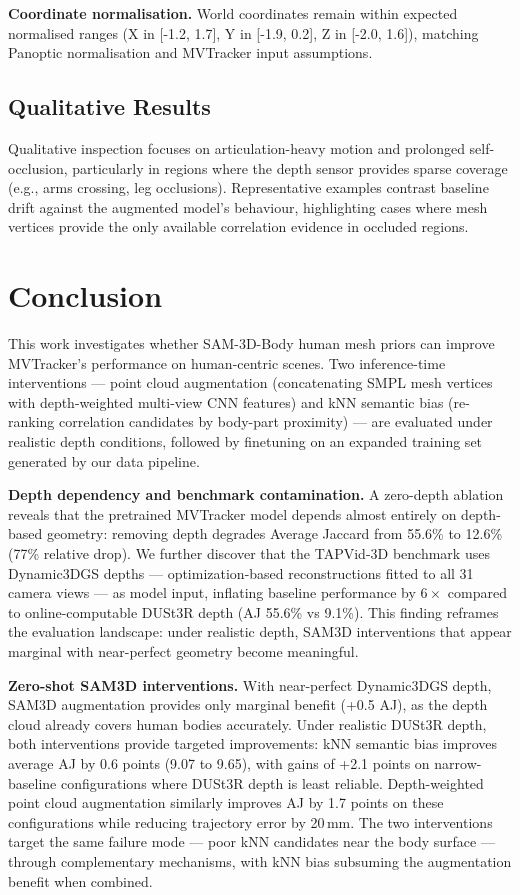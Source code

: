 \documentclass[12pt, a4paper, oneside]{report}
\begin{document}
\textbf{Coordinate normalisation.} World coordinates remain within expected normalised ranges (X in [-1.2, 1.7], Y in [-1.9, 0.2], Z in [-2.0, 1.6]), matching Panoptic normalisation and MVTracker input assumptions.

\section{Qualitative Results}
Qualitative inspection focuses on articulation-heavy motion and prolonged self-occlusion, particularly in regions where the depth sensor provides sparse coverage (e.g., arms crossing, leg occlusions). Representative examples contrast baseline drift against the augmented model's behaviour, highlighting cases where mesh vertices provide the only available correlation evidence in occluded regions.

\chapter{Conclusion}
This work investigates whether SAM-3D-Body human mesh priors can improve MVTracker's performance on human-centric scenes. Two inference-time interventions --- point cloud augmentation (concatenating SMPL mesh vertices with depth-weighted multi-view CNN features) and kNN semantic bias (re-ranking correlation candidates by body-part proximity) --- are evaluated under realistic depth conditions, followed by finetuning on an expanded training set generated by our data pipeline.

\textbf{Depth dependency and benchmark contamination.} A zero-depth ablation reveals that the pretrained MVTracker model depends almost entirely on depth-based geometry: removing depth degrades Average Jaccard from 55.6\% to 12.6\% (77\% relative drop). We further discover that the TAPVid-3D benchmark uses Dynamic3DGS depths --- optimization-based reconstructions fitted to all 31 camera views --- as model input, inflating baseline performance by $6\times$ compared to online-computable DUSt3R depth (AJ 55.6\% vs 9.1\%). This finding reframes the evaluation landscape: under realistic depth, SAM3D interventions that appear marginal with near-perfect geometry become meaningful.

\textbf{Zero-shot SAM3D interventions.} With near-perfect Dynamic3DGS depth, SAM3D augmentation provides only marginal benefit (+0.5 AJ), as the depth cloud already covers human bodies accurately. Under realistic DUSt3R depth, both interventions provide targeted improvements: kNN semantic bias improves average AJ by 0.6 points (9.07 to 9.65), with gains of +2.1 points on narrow-baseline configurations where DUSt3R depth is least reliable. Depth-weighted point cloud augmentation similarly improves AJ by 1.7 points on these configurations while reducing trajectory error by 20\,mm. The two interventions target the same failure mode --- poor kNN candidates near the body surface --- through complementary mechanisms, with kNN bias subsuming the augmentation benefit when combined.
\end{document}
